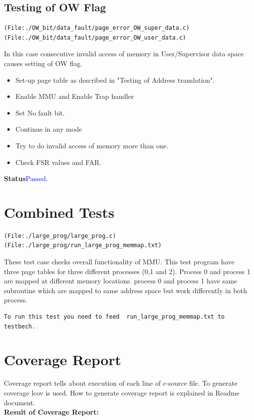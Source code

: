 \documentclass[12pt,a4paper]{article}
\begin{document}
\subsection{Testing of OW Flag}
\begin{lstlisting}
(File:./OW_bit/data_fault/page_error_OW_super_data.c)
(File:./OW_bit/data_fault/page_error_OW_user_data.c)
\end{lstlisting}
In this case consecutive  invalid access of memory in User/Supervisor data space causes setting of OW flag.

\begin{itemize}
\item Set-up page table as described in "Testing of Address translation". 
\item Enable MMU and Enable Trap handler
\item Set No fault bit.
\item Continue in any mode 
\item Try to do invalid access of memory more than one.  
\item Check FSR values and FAR.
\end{itemize}
\textbf{Status}\textcolor{blue}{Passed}.


\section{Combined Tests}
\begin{lstlisting}
(File:./large_prog/large_prog.c)
(File:./large_prog/run_large_prog_memmap.txt)

\end{lstlisting}
These test case checks overall functionality of MMU.
This test program have three page tables for three different processes (0,1 and 2). Process 0 and process 1 are mapped at different memory locations. process 0 and process 1 have same subroutine which are mapped to same address space but work differently in both process.
\begin{lstlisting}
To run this test you need to feed  run_large_prog_memmap.txt to
testbech.
\end{lstlisting} 

\newpage
\section{Coverage Report}
Coverage report tells about execution of each line of c-source file. To generate coverage lcov is used. How to generate coverage report is explained in Readme document.\\
\textbf{Result of Coverage Report:}
\end{document}
